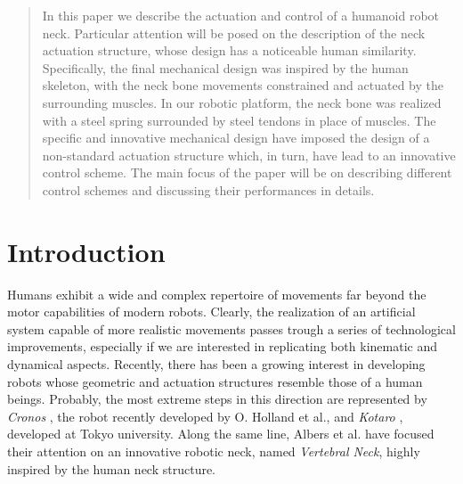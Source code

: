 \documentclass[conference]{IEEEtran}
\numberwithin{equation}{section}
\begin{document}

\maketitle

\begin{abstract}
In this paper we describe the actuation and control of a humanoid robot neck. Particular attention will be posed on the description of the neck actuation structure, whose design has a noticeable human similarity. Specifically, the final mechanical design was inspired by the human skeleton, with the neck bone movements constrained and actuated by the surrounding muscles. In our robotic platform, the neck bone was realized with a steel spring surrounded by steel tendons in place of muscles. The specific and innovative mechanical design have imposed the design of a non-standard actuation structure which, in turn, have lead to an innovative control scheme. The main focus of the paper will be on describing different control schemes and discussing their performances in details.
\end{abstract}


%
\IEEEpeerreviewmaketitle



\section{Introduction}

Humans exhibit a wide and complex repertoire of movements far beyond the motor capabilities of modern robots. Clearly, the realization of an artificial system capable of more realistic movements passes trough a series of technological improvements, especially if we are interested in replicating both kinematic and dynamical aspects. Recently, there has been a growing interest in developing robots whose geometric and actuation structures resemble those of a human beings. Probably, the most extreme steps in this direction are represented by {\em Cronos} \cite{Cronos}, the robot recently developed by O. Holland et al., and {\em Kotaro} \cite{Kotaro}, developed at Tokyo university. Along the same line, Albers et al. \cite{Albers03humanoid} have focused their attention on an innovative robotic neck, named {\em Vertebral Neck}, highly inspired by the human neck structure.
\end{document}
